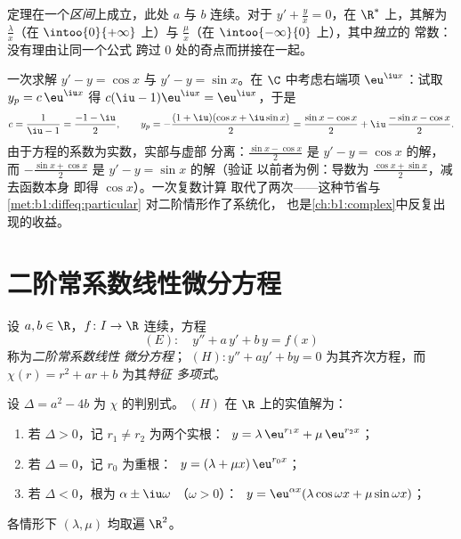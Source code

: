 \begin{remark}[区间不可忽视]
定理在一个\emph{区间}上成立，此处 $a$ 与 $b$
连续。对于 $y' + \frac yx = 0$，在 $\R^*$ 上，其解为
$\frac{\lambda}{x}$（在 $\intoo{0}{+\infty}$ 上）与
$\frac{\mu}{x}$（在 $\intoo{-\infty}{0}$ 上），其中\emph{独立}的
常数：没有理由让同一个公式
跨过 $0$ 处的奇点而拼接在一起。
\end{remark}

\begin{example}\label{ex:b1:diffeq:complexrhs}
一次求解 $y' - y = \cos x$ 与 $y' - y = \sin x$。在
$\C$ 中考虑右端项 $\eu^{\iu x}$：试取 $y_p =
c\,\eu^{\iu x}$ 得 $c(\iu - 1)\eu^{\iu x} = \eu^{\iu x}$，于是
\[
c = \frac1{\iu - 1} = \frac{-1 - \iu}2,
\qquad
y_p = -\frac{(1 + \iu)(\cos x + \iu\sin x)}2
= \frac{\sin x - \cos x}2 + \iu\,\frac{-\sin x - \cos x}2 .
\]
由于方程的系数为实数，实部与虚部
分离：$\frac{\sin x - \cos x}2$ 是 $y' - y = \cos x$ 的解，
而 $-\frac{\sin x + \cos x}2$ 是 $y' - y = \sin x$ 的解（验证
以前者为例：导数为 $\frac{\cos x + \sin x}2$，减去函数本身
即得 $\cos x$）。一次复数计算
取代了两次——这种节省与
\cref{met:b1:diffeq:particular} 对二阶情形作了系统化，
也是\cref{ch:b1:complex}中反复出现的收益。
\end{example}

\section{二阶常系数线性微分方程}

\begin{definition}\label{def:b1:diffeq:linear2}
设 $a, b \in \R$，$f \colon I \to \R$ 连续，方程
\[
(E)\colon\quad y'' + a\,y' + b\,y = f(x)
\]
称为\emph{二阶常系数线性
微分方程}；
$(H)\colon y'' + ay' + by = 0$ 为其齐次方程，而
$\chi(r) = r^2 + ar + b$ 为其\emph{特征
多项式}。
\end{definition}

\begin{theorem}[齐次解]\label{thm:b1:diffeq:homogeneous2}
设 $\Delta = a^2 - 4b$ 为 $\chi$ 的判别式。
$(H)$ 在 $\R$ 上的实值解为：
\begin{enumerate}
  \item 若 $\Delta > 0$，记 $r_1 \neq r_2$ 为两个实根：
        $\;y = \lambda\, \eu^{r_1 x} + \mu\, \eu^{r_2 x}$；
  \item 若 $\Delta = 0$，记 $r_0$ 为重根：
        $\;y = (\lambda + \mu x)\, \eu^{r_0 x}$；
  \item 若 $\Delta < 0$，根为 $\alpha \pm \iu\omega$
        （$\omega > 0$）：
        $\;y = \eu^{\alpha x} (\lambda \cos\omega x + \mu
        \sin\omega x)$；
\end{enumerate}
各情形下 $(\lambda, \mu)$ 均取遍 $\R^2$。
\end{theorem}

